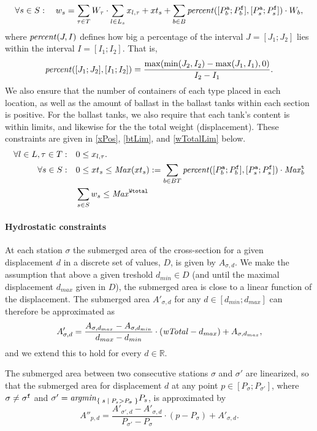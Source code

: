 \begin{equation}
\label{totalWeightDef}
	\forall s \in S:\quad w_s = \sum_{\tau \in T} W_\tau\cdot\sum_{l\in L_s} x_{l,\tau} + xt_s + \sum_{b\in B} \mathit{percent}([P^{\texttt{a}}_b;P^{\texttt{f}}_b],[P^{\texttt{a}}_s;P^{\texttt{f}}_s])\cdot W_b,
\end{equation}
where $\mathit{percent}(J, I)$ defines how big a percentage of the interval $J=[J_1; J_2]$ lies within the interval $I = [I_1; I_2]$. That is, 
\[
\mathit{percent}([J_1;J_2], [I_1; I_2]) = \frac{\max(\min(J_2, I_2)-\max(J_1, I_1),0)}{I_2-I_1}.
\]
We also ensure that the number of containers of each type placed in each location, as well as the amount of ballast in the ballast tanks within each section is positive. 
For the ballast tanks, we also require that each tank's content is within limits, and likewise for the the total weight (displacement). These constraints are given in \eqref{xPos}, \eqref{btLim}, and \eqref{wTotalLim} below.
\begin{align}
	\label{xPos}
	\forall l\in L, \tau\in T:&\quad 0 \leq x_{l,\tau}.\\
	\label{btLim}
	\forall s \in S:	&\quad 0 \leq xt_s \leq \mi{Max}(xt_s) := \sum_{b \in BT} \mi{percent}([P_b^\trt{a};P_b^\trt{f}],[P_s^\trt{a};P_s^\trt{f}])\cdot \mi{Max}^\trt{t}_b\\
%
	\label{wTotalLim}
	&\quad \sum_{s\in S} w_s \leq \mi{Max}^\trt{Wtotal}
\end{align}
\paragraph{Hydrostatic constraints}
At each station $\sigma$ the submerged area of the cross-section for a given displacement $d$ in a discrete set of values, $D$, is given by $A_{\sigma,d}$. 
We make the assumption that above a given treshold $d_{min}\in D$ (and until the maximal displacement $d_{max}$ given in $D$), the submerged area is close to a linear function of the displacement. The submerged area $A'_{\sigma,d}$ for any $d\in [d_{min};d_{max}]$ can therefore be approximated as 
\[
A'_{\sigma,d} = \frac{A_{\sigma,d_{max}} - A_{\sigma,d_{min}}}{d_{max} - d_{min}} \cdot (\mathit{wTotal} - d_{max}) + A_{\sigma,d_{max}},
\]
and we extend this to hold for every $d\in \mathbb{R}$.

The submerged area between two consecutive stations $\sigma$ and $\sigma'$ are linearized, so that the submerged area for displacement $d$ at any point $p\in[P_\sigma;P_{\sigma'}]$, where $\sigma\neq \sigma^{\texttt{f}}$ and $\sigma' = \mathit{argmin}_{\{\;{s}\;|\;{P_s > P_\sigma}\;\}}P_s$, is approximated by
\[
A''_{p,d} = \frac{A'_{\sigma',d}-A'_{\sigma,d}}{P_{\sigma'}-P_\sigma}\cdot(p-P_\sigma) + A'_{\sigma,d}.
\]

